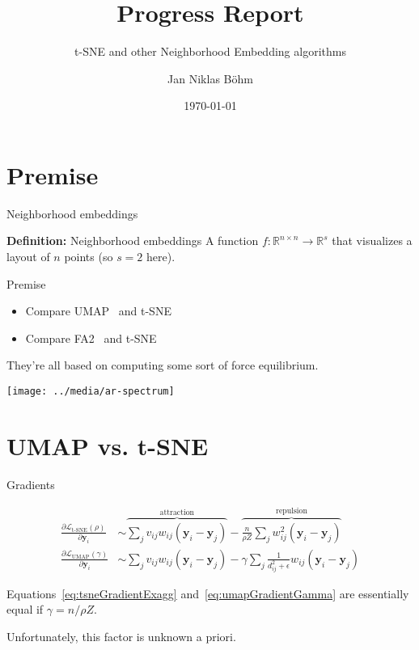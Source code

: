 \documentclass{beamer}
\title{Progress Report}
\subtitle{t-SNE and other Neighborhood Embedding algorithms}
\author{Jan Niklas Böhm}
\institute{University of Tübingen}
\date{\today}
\begin{document}
\maketitle

\section*{Premise}

\begin{frame}{Neighborhood embeddings}
  \begin{block}{\textbf{Definition:} Neighborhood embeddings}
    A function $f: \mathbb R^{n\times n} \to \mathbb R^s$ that
    visualizes a layout of $n$ points (so $s=2$ here).
  \end{block}
\end{frame}

\begin{frame}{Premise}
  \begin{itemize}
  \item Compare UMAP~\citep{mcinnes2018umap} and t-SNE~\citep{maaten2008visualizing}
  \item Compare FA2~\citep{jacomy2014forceatlas2} and t-SNE
  \end{itemize}

  \bigskip\pause They're all based on computing some sort of force equilibrium.
\end{frame}

\begin{frame}[plain]{}
  \vfill
  \centering\texttt{[image: ../media/ar-spectrum]}
  \vfill
\end{frame}

\section*{UMAP vs. t-SNE}

\begin{frame}{Gradients}

  \begin{align}
    \frac{\partial \mathcal L_{\textrm{t-SNE}}(\rho)}{\partial \mathbf y_i} &\sim \overbrace{\sum_j v_{ij}w_{ij}(\mathbf y_i-\mathbf y_j)}^{\text{attraction}} - \overbrace{\frac{n}{\rho Z}\sum_j w_{ij}^2(\mathbf y_i-\mathbf y_j)}^{\text{repulsion}} \label{eq:tsneGradientExagg}\\
    \frac{\partial \mathcal L_{\textrm{UMAP}}(\gamma)}{\partial \mathbf y_i} &\sim \sum_j v_{ij}w_{ij}(\mathbf y_i-\mathbf y_j) - \gamma \sum_j \frac{1}{d_{ij}^2 +\epsilon}w_{ij}(\mathbf y_i-\mathbf y_j) \label{eq:umapGradientGamma}
  \end{align}

  Equations~\ref{eq:tsneGradientExagg} and~\ref{eq:umapGradientGamma}
  are essentially equal if $\gamma={n/\rho Z}$.

  \bigskip\pause Unfortunately, this factor is unknown a priori.
\end{frame}
\end{document}
